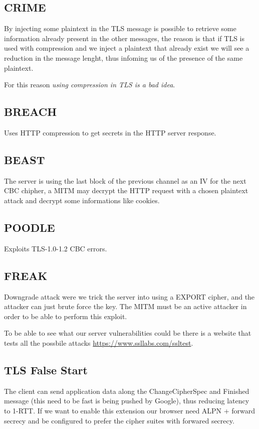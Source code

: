 \documentclass[12pt]{article}
\begin{document}
\subsection{CRIME}
By injecting some plaintext in the TLS message is possible to retrieve some information already present in the other messages, the reason is that if TLS is used with compression and we inject a plaintext that already exist we will see a reduction in the message lenght, thus infoming us of the presence of the same plaintext. 

For this reason \textit{using compression in TLS is a bad idea}.

\subsection{BREACH}
Uses HTTP compression to get secrets in the HTTP server response.

\subsection{BEAST}
The server is using the last block of the previous channel as an IV for the next CBC chipher, a MITM may decrypt the HTTP request with a chosen plaintext attack and decrypt some informations like cookies. 

\subsection{POODLE}
Exploits TLS-1.0-1.2 CBC errors.

\subsection{FREAK}
Downgrade attack were we trick the server into using a EXPORT cipher, and the attacker can just brute force the key. The MITM must be an active attacker in order to be able to perform this exploit.

To be able to see what our server vulnerabilities could be there is a website that tests all the possbile attacks \url{https://www.ssllabs.com/ssltest}.

\subsection{TLS False Start}
The client can send application data along the ChangeCipherSpec and Finished message (this need to be fast is being pushed by Google), thus reducing latency to 1-RTT. If we want to enable this extension our browser need ALPN + forward secrecy and be configured to prefer the cipher suites with forwared secrecy.
\end{document}
